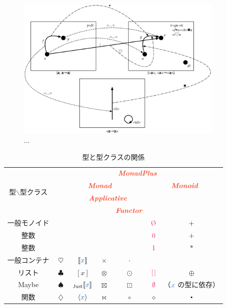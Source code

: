 \documentclass[a5paper,twoside,fleqn,draft]{jsbook}
\def\[{[\![}
\def\]{]\!]}
\def\constantColor{WildStrawberry}
\def\varColor{NavyBlue}
\def\typeColor{RedOrange}
\newcommand{\code}[1]{\texttt{#1}}
\newcommand{\mConstant}[1]{\textcolor{\constantColor}{#1}}
\newcommand{\mSpecialConstant}[1]{\textcolor{\constantColor}{\textrm{#1}}}
\newcommand{\mZeroNumber}{{\mConstant{0}}}
\newcommand{\mOneNumber}{{\mConstant{1}}}
\newcommand{\mEmptyList}{{\textcolor{\constantColor}{[\,]}}}
\newcommand{\mNothing}{\textcolor{\constantColor}{\emptyset}}
\newcommand{\mZero}{\mSpecialConstant{\O}}
\newcommand{\mVar}[1]{\textcolor{\varColor}{#1}}
\newcommand{\mAnonParam}{\diamond}
\newcommand{\mXVar}{\mVar{x}}
\DeclareMathOperator{\mAppend}{\oplus}
\DeclareMathOperator{\mAppMap}{\times}
\DeclareMathOperator{\mAppMapFunc}{\bowtie}
\DeclareMathOperator{\mAppMapList}{\otimes}
\DeclareMathOperator{\mAppMapMaybe}{\boxtimes}
\DeclareMathOperator{\mBind}{\heartsuit}
\DeclareMathOperator{\mBindFunc}{\diamondsuit}
\DeclareMathOperator{\mBindList}{\clubsuit}
\DeclareMathOperator{\mBindMaybe}{\spadesuit}
\DeclareMathOperator{\mCompFunc}{\centerdot}
\DeclareMathOperator{\mMap}{\cdot}
\DeclareMathOperator{\mMapFunc}{\circ}
\DeclareMathOperator{\mMapList}{\odot}
\DeclareMathOperator{\mMapMaybe}{\boxdot}
\DeclareMathOperator{\mPlus}{\bf{+}} %
\newcommand{\mValueConstructor}[1]{\mathrm{#1}}
\newcommand{\mValueWith}[2]{{}_\mValueConstructor{#1}\[\mVar{#2}\]}
\newcommand{\mJustWith}[1]{\mValueWith{Just}{#1}}
\newcommand{\mConstWith}[1]{\langle\mVar{#1}\rangle}
\newcommand{\mPureWith}[1]{\[\mVar{#1}\]}
\newcommand{\mTypeClass}[1]{\textcolor{\typeColor}{\textbf{\textit{#1}}}}
\newcommand{\mApplicativeTypeClass}{\mTypeClass{Applicative}}
\newcommand{\mFunctorTypeClass}{\mTypeClass{Functor}}
\newcommand{\mMonadTypeClass}{\mTypeClass{Monad}}
\newcommand{\mMonadPlusTypeClass}{\mTypeClass{MonadPlus}}
\newcommand{\mMonoidTypeClass}{\mTypeClass{Monoid}}
\begin{document}
\begin{figure}
\begin{center}
\includegraphics[width=100mm]{fig/functor.eps}
\end{center}
\caption{...}
\label{fig:functor}
\end{figure}


\begin{table}
\label{tab:monadplus}
\caption{型と型クラスの関係}
\begin{center}
\begin{tabular}{||c||c|c|c|c|c|c||}
\hline
\multirow{4}{*}{型$\backslash$型クラス}
  &\multicolumn{6}{|c||}{$\mMonadPlusTypeClass$}\\
\cline{2-7}
\multirow{3}{*}{}
  &\multicolumn{4}{|c|}{$\mMonadTypeClass$}
  &\multicolumn{2}{|c||}{$\mMonoidTypeClass$}\\
\cline{3-5}
\multirow{2}{*}{}
  &
  &\multicolumn{3}{|c|}{$\mApplicativeTypeClass$}
  &\multicolumn{2}{|c||}{}\\
\cline{5-5}
\multirow{1}{*}{}
  &
  &\multicolumn{2}{|c|}{}
  &$\mFunctorTypeClass$
  &\multicolumn{2}{|c||}{}\\
\hline\hline
一般モノイド
  &
  &
  &
  &
  &$\mZero$
  &$\mPlus$\\
\hline
整数
  &
  &
  &
  &
  &$\mZeroNumber$
  &$+$\\
\hline
整数
  &
  &
  &
  &
  &$\mOneNumber$
  &$*$\\
\hline\hline
一般コンテナ
  &$\mBind$
  &$\mPureWith{x}$
  &$\mAppMap$
  &$\mMap$
  &
  &\\
\hline
リスト
  &$\mBindList$
  &$[x]$
  &$\mAppMapList$
  &$\mMapList$
  &$\mEmptyList$
  &$\mAppend$\\
\hline
Maybe
  &$\mBindMaybe$
  &$\mJustWith{x}$
  &$\mAppMapMaybe$
  &$\mMapMaybe$
  &$\mNothing$
  &（$\mXVar$ の型に依存）\\
\hline
関数
  &$\mBindFunc$
  &$\mConstWith{x}$
  &$\mAppMapFunc$
  &$\mMapFunc$
  &$\mAnonParam$
  &$\mCompFunc$\\
\hline
\end{tabular}
\end{center}
\end{table}
\end{document}

